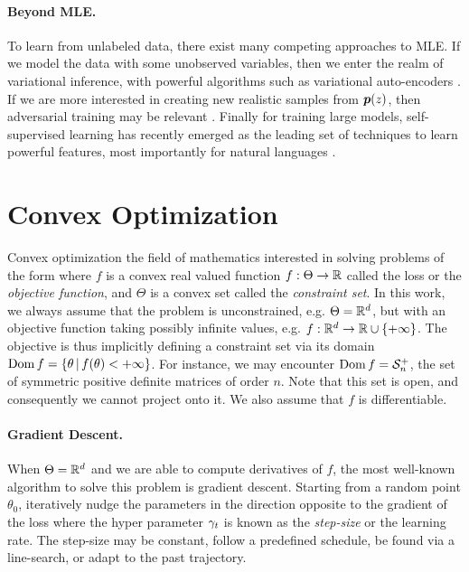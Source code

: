 \paragraph{Beyond MLE.} 
To learn from unlabeled data, there exist many competing approaches to MLE. 
If we model the data with some unobserved variables, then we enter the realm of variational inference, with powerful algorithms such as variational auto-encoders \citep{kingma2013auto}. 
If we are more interested in creating new realistic samples from $\bm{p}(z)$, then adversarial training may be relevant \citep{goodfellow2014generative}.
Finally for training large models, self-supervised learning has recently emerged as the leading set of techniques to learn powerful features, most importantly for natural languages \citep{peters2018deep,devlin2018bert}.


\section{Convex Optimization}
Convex optimization the field of mathematics interested in solving problems of the form
where $f$ is a convex real valued function $f:\Theta \rightarrow \mathbb{R}$ called the loss or the \emph{objective function}, and $\Theta$ is a convex set called the \emph{constraint set}.
In this work, we always assume that the problem is unconstrained, e.g. $\Theta = \mathbb{R}^d$, 
but with an objective function taking possibly infinite values, e.g. $f : \mathbb{R}^d \rightarrow \mathbb{R} \cup \{+\infty\}$. 
The objective is thus implicitly defining a constraint set via its domain $\operatorname{\mathrm{Dom}} f = \{ \theta \,\vert\, f(\theta) < +\infty \}$.
For instance, we may encounter $\operatorname{\mathrm{Dom}} f = {\mathcal S}_n^+$, the set of symmetric positive definite matrices of order $n$. Note that this set is open, and consequently we cannot project onto it.
We also assume that $f$ is differentiable.

\paragraph{Gradient Descent.}
When $\Theta = \mathbb{R}^d$ and we are able to compute  derivatives of $f$, the most well-known algorithm to solve this problem is gradient descent. 
Starting from a random point $\theta_0$, iteratively nudge the parameters in the direction opposite to the gradient of the loss
where the hyper parameter $\gamma_t$ is known as the \emph{step-size} or the learning rate. 
The step-size may be constant, follow a predefined schedule, be found via a line-search, or adapt to the past trajectory.

